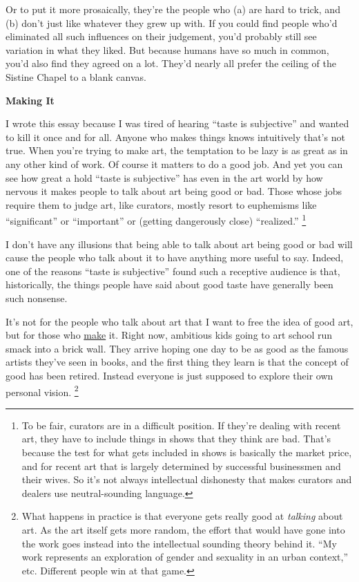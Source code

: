 \documentclass[12pt]{book}
\begin{document}
Or to put it more prosaically, they're the people who (a) are hard to
trick, and (b) don't just like whatever they grew up with. If you could
find people who'd eliminated all such influences on their judgement,
you'd probably still see variation in what they liked. But because
humans have so much in common, you'd also find they agreed on a lot.
They'd nearly all prefer the ceiling of the Sistine Chapel to a blank
canvas.

\textbf{Making It}

I wrote this essay because I was tired of hearing ``taste is
subjective'' and wanted to kill it once and for all. Anyone who makes
things knows intuitively that's not true. When you're trying to make
art, the temptation to be lazy is as great as in any other kind of work.
Of course it matters to do a good job. And yet you can see how great a
hold ``taste is subjective'' has even in the art world by how nervous it
makes people to talk about art being good or bad. Those whose jobs
require them to judge art, like curators, mostly resort to euphemisms
like ``significant'' or ``important'' or (getting dangerously close)
``realized.'' \footnote{To be fair, curators are in a difficult position. If they're
dealing with recent art, they have to include things in shows that they
think are bad. That's because the test for what gets included in shows
is basically the market price, and for recent art that is largely
determined by successful businessmen and their wives. So it's not always
intellectual dishonesty that makes curators and dealers use
neutral-sounding language.}

I don't have any illusions that being able to talk about art being good
or bad will cause the people who talk about it to have anything more
useful to say. Indeed, one of the reasons ``taste is subjective'' found
such a receptive audience is that, historically, the things people have
said about good taste have generally been such nonsense.

It's not for the people who talk about art that I want to free the idea
of good art, but for those who \href{taste.html}{make} it. Right now,
ambitious kids going to art school run smack into a brick wall. They
arrive hoping one day to be as good as the famous artists they've seen
in books, and the first thing they learn is that the concept of good has
been retired. Instead everyone is just supposed to explore their own
personal vision. \footnote{What happens in practice is that everyone gets really good at
\emph{talking} about art. As the art itself gets more random, the effort
that would have gone into the work goes instead into the intellectual
sounding theory behind it. ``My work represents an exploration of gender
and sexuality in an urban context,'' etc. Different people win at that
game.}
\end{document}
